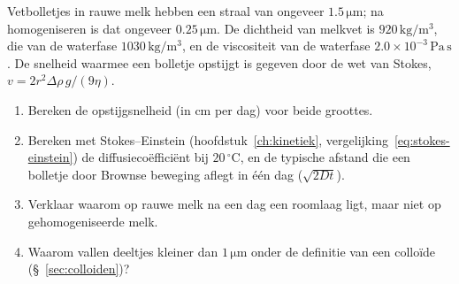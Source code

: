 \begin{oefening}\label{oef:melk-stokes}
Vetbolletjes in rauwe melk hebben een straal van ongeveer \(1.5\,\mathrm{\mu m}\); na homogeniseren is dat ongeveer \(0.25\,\mathrm{\mu m}\). De dichtheid van melkvet is \(920\,\mathrm{kg/m^3}\), die van de waterfase \(1030\,\mathrm{kg/m^3}\), en de viscositeit van de waterfase \(2.0\times10^{-3}\,\mathrm{Pa\,s}\). De snelheid waarmee een bolletje opstijgt is gegeven door de wet van Stokes, \(v = 2r^2\Delta\rho\,g/(9\eta)\).

\begin{enumerate}
\item[(a)]
  Bereken de opstijgsnelheid (in cm per dag) voor beide groottes.
\item[(b)]
  Bereken met Stokes--Einstein (hoofdstuk~\ref{ch:kinetiek}, vergelijking~\eqref{eq:stokes-einstein}) de diffusiecoëfficiënt bij \(20\,^\circ\mathrm{C}\), en de typische afstand die een bolletje door Brownse beweging aflegt in één dag (\(\sqrt{2Dt}\)).
\item[(c)]
  Verklaar waarom op rauwe melk na een dag een roomlaag ligt, maar niet op gehomogeniseerde melk.
\item[(d)]
  Waarom vallen deeltjes kleiner dan \(1\,\mathrm{\mu m}\) onder de definitie van een colloïde (\S~\ref{sec:colloiden})?
\end{enumerate}
\end{oefening}
